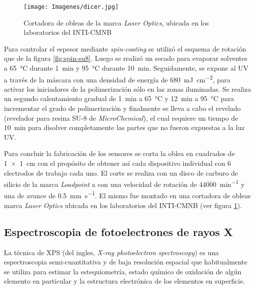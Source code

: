 			\begin{figure}[b!]
			 		  \begin{center}
			 		  \texttt{[image: Imagenes/dicer.jpg]}
			 		  \caption[Cortadora de obleas]{Cortadora de obleas de la marca \textit{Laser Optics}, ubicada en los laboratorios del INTI-CMNB}
			 		  \label{fig:dicer}
			 		  \end{center}
			 		  \end{figure}
		
		Para controlar el espesor mediante \textit{spin-coating} se utilizó el esquema de rotación que de la figura \ref{fig:spin-su8}. Luego se realizó un secado para evaporar solventes a \SI{65}{\celsius} durante \SI{1}{\minute} y \SI{95}{\celsius} durante \SI{10}{\minute}. Seguidamente, se expone al UV a través de la máscara con una densidad de energía de \SI{680}{mJ.cm^{-2}}, para activar los iniciadores de la polimerización sólo en las zonas iluminadas. Se realiza un segundo calentamiento gradual de \SI{1}{\minute} a \SI{65}{\celsius} y \SI{12}{\minute} a \SI{95}{\celsius} para incrementar el grado de polimerización y finalmente se lleva a cabo el revelado (revelador para resina SU-8 de \textit{MicroChemical}), el cual requiere un tiempo de \SI{10}{\minute} para disolver completamente las partes que no fueron expuestas a la luz UV. 
		
		Para concluir la fabricación de los sensores se corta la oblea en cuadrados de \SI{1x1}{\cm} con el propósito de obtener así cada dispositivo individual con 6 electrodos de trabajo cada uno. El corte se realiza con un disco de carburo de silicio de la marca \textit{Loadpoint} a con una velocidad de rotación de \SI{44000}{\minute^{-1}} y una de avance de \SI{0.5}{\mm\per\second}. El mismo fue montado en una cortadora de obleas marca \textit{Laser Optics} ubicada en los laboratorios del INTI-CMNB (ver figura \ref{fig:dicer}).
	
	\subsection{Espectroscopia de fotoelectrones de rayos X}

		La técnica de XPS (del ingles, \textit {X-ray photoelectron spectroscopy}) es una espectroscopia semi-cuantitativa y de baja resolución espacial que habitualmente se utiliza para estimar la estequiometría, estado químico de oxidación de algún elemento en particular y la estructura electrónica de los elementos en superficie.\cite{siegbahn1956,siegbahn1981}

